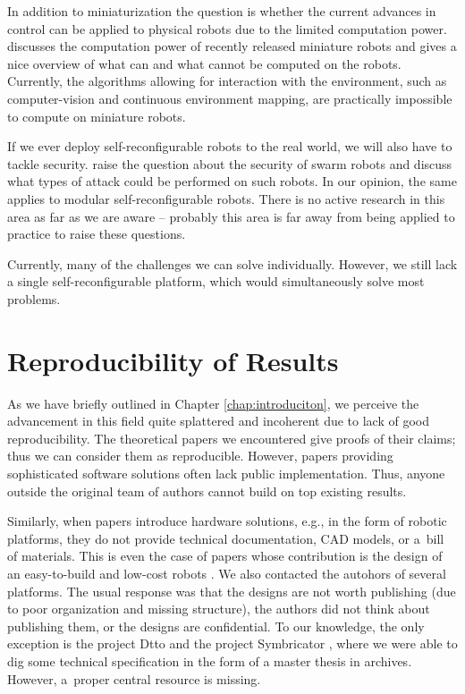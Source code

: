 In addition to miniaturization the question is whether the current advances in
control can be applied to physical robots due to the limited computation power.
\textcite{DBLP:journals/ral/Trenkwalder19} discusses the computation power of
recently released miniature robots and gives a nice overview of what can and
what cannot be computed on the robots. Currently, the algorithms allowing for
interaction with the environment, such as computer-vision and continuous
environment mapping, are practically impossible to compute on miniature robots.

If we ever deploy self-reconfigurable robots to the real world, we will also
have to tackle security. \textcite{DBLP:conf/icas/HigginsTM09} raise the
question about the security of swarm robots and discuss what types of attack
could be performed on such robots. In our opinion, the same applies to modular
self-reconfigurable robots. There is no active research in this area as far as
we are aware -- probably this area is far away from being applied to practice to
raise these questions.

Currently, many of the challenges we can solve individually. However, we still
lack a single  self-reconfigurable platform, which would
simultaneously solve most problems.

\section{Reproducibility of Results}\label{sec:reproducibility}

As we have briefly outlined in Chapter \ref{chap:introduciton}, we perceive the
advancement in this field quite splattered and incoherent due to lack of good
reproducibility. The theoretical papers we encountered give proofs of their
claims; thus we can consider them as reproducible. However, papers providing
sophisticated software solutions often lack public implementation. Thus, anyone
outside the original team of authors cannot build on top existing results.

Similarly, when papers introduce hardware solutions, e.g., in the form of
robotic platforms, they do not provide technical documentation, CAD models, or
a~bill of materials. This is even the case of papers whose contribution is the
design of an easy-to-build and low-cost robots \cite{DBLP:conf/robio/YuLW17}. We
also contacted the autohors of several platforms. The usual response was that
the designs are not worth publishing (due to poor organization and missing
structure), the authors did not think about publishing them, or the designs are
confidential. To our knowledge, the only exception is the project Dtto
\cite{otrebla333} and the project Symbricator
\cite{DBLP:journals/corr/abs-1109-2288}, where we were able to dig some
technical specification in the form of a master thesis in archives. However,
a~proper central resource is missing.
